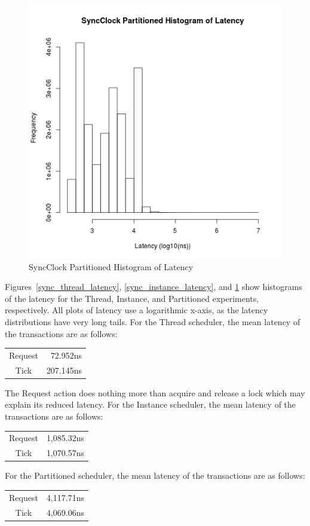 \begin{figure}[H]
\center
\includegraphics[height=.4\textheight]{sync_partitioned_latency_hist.png}
\caption{SyncClock Partitioned Histogram of Latency}
\label{sync_partitioned_latency}
\end{figure}

Figures~\ref{sync_thread_latency}, \ref{sync_instance_latency}, and \ref{sync_partitioned_latency} show histograms of the latency for the Thread, Instance, and Partitioned experiments, respectively.
All plots of latency use a logarithmic x-axis, as the latency distributions have very long tails.
For the Thread scheduler, the mean latency of the transactions are as follows:
\begin{center}
\begin{tabular}{cr}
Request &  72.952ns \\
Tick    & 207.145ns \\
\end{tabular}
\end{center}
The Request action does nothing more than acquire and release a lock which may explain its reduced latency.
For the Instance scheduler, the mean latency of the transactions are as follows:
\begin{center}
\begin{tabular}{cr}
Request & 1,085.32ns \\
Tick    & 1,070.57ns \\
\end{tabular}
\end{center}
For the Partitioned scheduler, the mean latency of the transactions are as follows:
\begin{center}
\begin{tabular}{cr}
Request & 4,117.71ns \\
Tick    & 4,069.06ns \\
\end{tabular}
\end{center}

